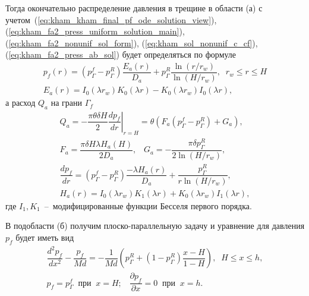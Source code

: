 \documentclass{article}
\newcommand{\mysub}[1]{%
  \par\vspace{0.5em}\noindent{\normalsize\underline{#1}}\par\vspace{0.5em}%
}
\begin{document}
Тогда окончательно распределение давления в трещине в области (а) с учетом~(\ref{eq:kham_kham_final_pf_ode_solution_view}), (\ref{eq:kham_fa2_press_uniform_solution_main}), (\ref{eq:kham_fa2_nonunif_sol_form}), (\ref{eq:kham_sol_nonunif_c_cf}), (\ref{eq:kham_fa2_press_ab_sol}) будет определяться по формуле
\begin{equation}
\displaystyle
\begin{gathered}
p_f\left(r\right) = \left(p^f_{\Gamma} - p^R_{\Gamma}\right)
\dfrac{E_a\left(r\right)}{D_a}
+ p^R_{\Gamma} \dfrac{\ln\left(r/r_w\right)}{\ln{\left(H/r_w\right)}}, \;\;
r_w \leq r \leq H \\[6pt]
E_a\left(r\right) = I_0\left(\lambda r_w\right)K_0\left(\lambda r\right) - K_0\left(\lambda r_w\right)I_0\left(\lambda r\right),
\end{gathered}
\label{eq:kham_final_sol_pf_radial}
\end{equation}
а расход $Q_a$ на грани $\Gamma_f$
\begin{equation}
\displaystyle
\begin{gathered}
Q_a = - \dfrac{\pi \theta \delta H}{2} \left.\dfrac{d p_f}{d r}\right|_{r=H} =
\theta \left(    F_a \left(p^f_{\Gamma} - p^R_{\Gamma}\right) + G_a \right) , \\[8pt]
F_a = \dfrac{\pi \delta H \lambda H_a\left(H\right)}{2D_a}, \;\;\;
G_a = -\dfrac{\pi \delta p^R_{\Gamma}}{2 \ln{\left(H/r_w\right)}},  \\[8pt]
\dfrac{d p_f}{d r} = \left(p^f_{\Gamma} - p^R_{\Gamma}\right)
\dfrac{-\lambda H_a\left(r\right)}{D_a} +
\dfrac{p^R_{\Gamma}}{r \ln{\left(H/r_w\right)}}, \\[8pt]
H_a\left(r\right) =
I_0\left(\lambda r_w\right)K_1\left(\lambda r\right) +
K_0\left(\lambda r_w\right)I_1\left(\lambda r\right),
\end{gathered}
\label{eq:kham_q_Gf}
\end{equation}
где $I_1, K_1$~--~модифицированные функции Бесселя первого порядка.

\mysub{Подобласть (б) $H \leq x \leq h$}
В подобласти (б) получим плоско-параллельную задачу и уравнение для давления $p_f$ будет иметь вид
\begin{equation}
\displaystyle
\begin{gathered}
\dfrac{d^2 p_f}{dx^2}-\dfrac{p_f}{Md}=-\dfrac{1}{Md}\left(p^R_{\Gamma} + (1 - p^R_{\Gamma})\dfrac{x - H}{1-H}\right), \;\; H \leq x \leq h, \\
p_f = p^f_{\Gamma}  \;\; \text{при} \;\; x = H; \;\;\; \dfrac{\partial p_f}{\partial x} = 0 \;\; \text{при} \;\; x = h.
\end{gathered}
\label{eq:kham_approx_pf_part2}
\end{equation}
\end{document}
